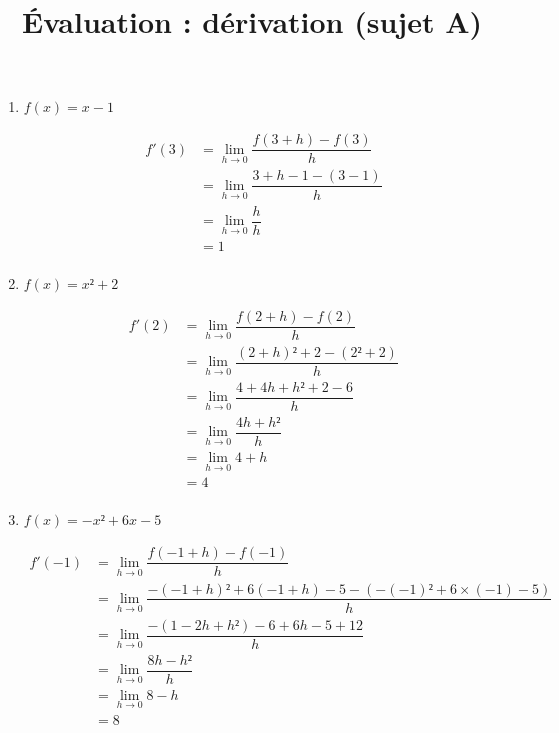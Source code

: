 \documentclass[
	classe=$1^{ere}STI2D$,
]{évaluation}
\begin{document}
\title{Évaluation : dérivation (sujet A)}
\maketitle

\begin{exercice}
	\begin{enumerate}
		\item $f(x) = x - 1$

		      \begin{align*}
			      f'(3) & = \lim_{h→0} \dfrac{f(3+h) - f(3)}{h}       \\
			            & = \lim_{h→0} \dfrac{3 + h - 1 - (3 - 1)}{h} \\
			            & = \lim_{h→0} \dfrac{h}{h}                   \\
			            & = 1                                         \\
		      \end{align*}
		\item $f(x) = x² + 2$

		      \begin{align*}
			      f'(2) & = \lim_{h→0} \dfrac{f(2+h) - f(2)}{h}           \\
			            & = \lim_{h→0} \dfrac{(2 + h)² + 2 - (2² + 2)}{h} \\
			            & = \lim_{h→0} \dfrac{4 + 4h + h² + 2 - 6}{h}     \\
			            & = \lim_{h→0} \dfrac{4h + h²}{h}                 \\
			            & = \lim_{h→0} 4 + h                              \\
			            & = 4                                             \\
		      \end{align*}
		\item $f(x) = -x² + 6x - 5$

		      \begin{align*}
			      f'(-1) & = \lim_{h→0} \dfrac{f(-1+h) - f(-1)}{h}                                    \\
			             & = \lim_{h→0} \dfrac{-(-1 + h)² + 6(-1 + h) - 5 - (-(-1)² + 6×(-1) - 5)}{h} \\
			             & = \lim_{h→0} \dfrac{-(1 - 2h + h²) - 6 + 6h - 5 + 12}{h}                   \\
			             & = \lim_{h→0} \dfrac{8h - h²}{h}                                            \\
			             & = \lim_{h→0} 8 - h                                                         \\
			             & = 8                                                                        \\
		      \end{align*}
	\end{enumerate}
\end{exercice}
\end{document}
